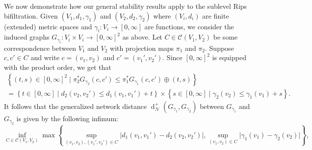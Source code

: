 \documentclass[a4paper,11pt]{article}
\newcommand{\atensor}{\oplus}
\theoremstyle{remark}
\begin{document}
We now demonstrate how our general stability results apply to the sublevel Rips bifiltration. Given $(V_1,d_1,\gamma_1)$ and $(V_2,d_2,\gamma_2)$ where $(V_i,d_i)$ are finite (extended) metric spaces and $\gamma_i\colon V_i\to[0,\infty]$ are functions, we consider the induced graphs $G_{\gamma_i}\colon V_i\times V_i\to [0,\infty]^2$ as above. Let $C\in\mathcal{C}(V_1,V_2)$ be some correspondence between $V_1$ and $V_2$ with projection maps $\pi_1$ and $\pi_2$. Suppose $c,c'\in C$ and write $c=(v_1,v_2)$ and $c'=(v_1',v_2')$. Since $[0,\infty]^2$ is equipped with the product order, we get that
\begin{multline*}
\left\{(t,s)\in [0,\infty]^2\mid\pi_2^*G_{\gamma_2}(c,c')\leq\pi_1^*G_{\gamma_1}(c,c')\atensor (t,s)\right\}\\=\left\{t\in [0,\infty]\mid d_2(v_2,v_2')\leq d_1(v_1,v_1')+t\right\}\times\left\{s\in[0,\infty]\mid\gamma_2(v_2)\leq\gamma_1(v_1)+s\right\}.
\end{multline*}
It follows that the generalized network distance $\operatorname{d}_{\mathcal{N}}^+(G_{\gamma_1},G_{\gamma_2})$ between $G_{\gamma_1}$ and $G_{\gamma_2}$ is given by the following infimum:
\begin{equation*}
\inf_{C\in\mathcal{C}(V_1,V_2)}\max\left\{\sup_{(v_1,v_2),(v_1',v_2')\in C}\vert d_1(v_1,v_1')-d_2(v_2,v_2')\vert,\sup_{(v_1,v_2)\in C}\vert\gamma_1(v_1)-\gamma_2(v_2)\vert\right\},
\end{equation*}
\end{document}

